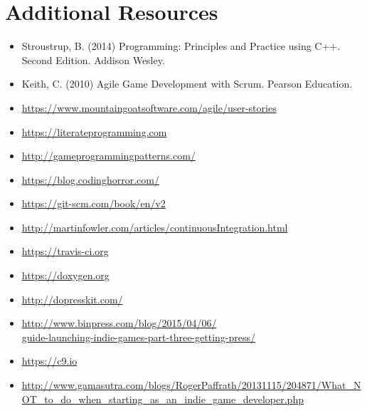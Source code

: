 \documentclass{../fal_assignment}
\begin{document}
\section*{Additional Resources}

\begin{itemize}
    \item Stroustrup, B. (2014) Programming: Principles and Practice using C++. Second Edition. Addison Wesley.
    \item Keith, C. (2010) Agile Game Development with Scrum. Pearson Education.
    \item \url{https://www.mountaingoatsoftware.com/agile/user-stories}
    \item \url{https://literateprogramming.com}
    \item \url{http://gameprogrammingpatterns.com/}
    \item \url{https://blog.codinghorror.com/}
    \item \url{https://git-scm.com/book/en/v2}
    \item \url{http://martinfowler.com/articles/continuousIntegration.html}
    \item \url{https://travis-ci.org}
    \item \url{https://doxygen.org}
    \item \url{http://dopresskit.com/}
    \item \url{http://www.binpress.com/blog/2015/04/06/}\\ \url{guide-launching-indie-games-part-three-getting-press/}
    \item \url{https://c9.io}
    \item \url{http://www.gamasutra.com/blogs/RogerPaffrath/20131115/204871/What_NOT_to_do_when_starting_as_an_indie_game_developer.php}
\end{itemize}
\end{document}
